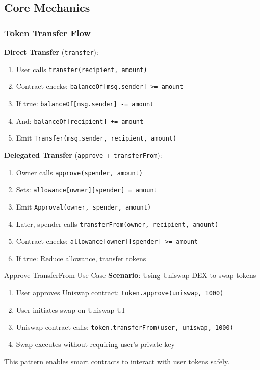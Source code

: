\documentclass[11pt,a4paper]{article}
\begin{document}
\subsection{Core Mechanics}

\subsubsection{Token Transfer Flow}

\textbf{Direct Transfer} (\texttt{transfer}):
\begin{enumerate}
  \item User calls \texttt{transfer(recipient, amount)}
  \item Contract checks: \texttt{balanceOf[msg.sender] >= amount}
  \item If true: \texttt{balanceOf[msg.sender] -= amount}
  \item And: \texttt{balanceOf[recipient] += amount}
  \item Emit \texttt{Transfer(msg.sender, recipient, amount)}
\end{enumerate}

\textbf{Delegated Transfer} (\texttt{approve} + \texttt{transferFrom}):
\begin{enumerate}
  \item Owner calls \texttt{approve(spender, amount)}
  \item Sets: \texttt{allowance[owner][spender] = amount}
  \item Emit \texttt{Approval(owner, spender, amount)}
  \item Later, spender calls \texttt{transferFrom(owner, recipient, amount)}
  \item Contract checks: \texttt{allowance[owner][spender] >= amount}
  \item If true: Reduce allowance, transfer tokens
\end{enumerate}

\begin{examplebox}{Approve-TransferFrom Use Case}
\textbf{Scenario}: Using Uniswap DEX to swap tokens

\begin{enumerate}
  \item User approves Uniswap contract: \texttt{token.approve(uniswap, 1000)}
  \item User initiates swap on Uniswap UI
  \item Uniswap contract calls: \texttt{token.transferFrom(user, uniswap, 1000)}
  \item Swap executes without requiring user's private key
\end{enumerate}

This pattern enables smart contracts to interact with user tokens safely.
\end{examplebox}
\end{document}
